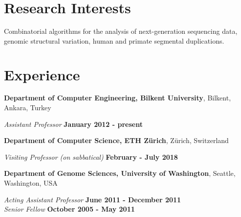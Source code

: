 \documentclass[margin,line]{res}
\begin{document}
\begin{resume}

  
  
  \section{\sc Research Interests}
  Combinatorial algorithms for the analysis of next-generation sequencing data, 
  genomic structural variation,  human and primate
  segmental duplications. %

          \section{\sc Experience}
                  {\bf Department of Computer Engineering, Bilkent University},
                  Bilkent, Ankara, Turkey
                  
                  \vspace{-.3cm}
                         {\em Assistant Professor} \hfill {\bf January 2012 - present} 

                 {\bf Department of Computer Science, ETH Zürich},
                  Zürich, Switzerland
                  
                  \vspace{-.1cm}
                         {\em Visiting Professor (on sabbatical)} \hfill {\bf February - July 2018} 
                         
                 {\bf Department of Genome Sciences, University of Washington},
                         Seattle, Washington, USA
                         
                         \vspace{-.3cm}
                                {\em Acting Assistant Professor} \hfill {\bf June 2011 - December 2011} \\                           %
                                      {\em Senior Fellow} \hfill {\bf October 2005 - May 2011}
                                       

\end{resume}
\end{document}
